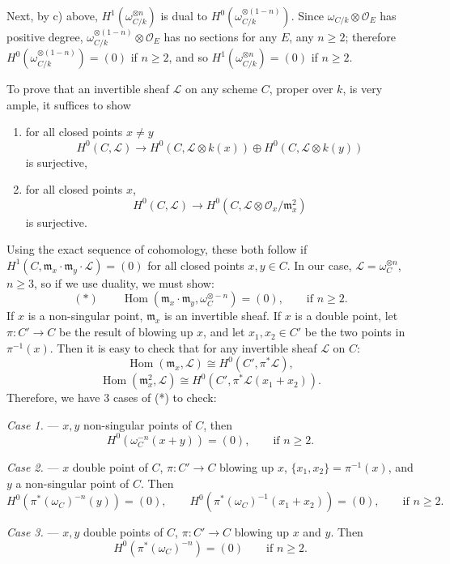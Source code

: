 \documentclass[10pt]{article}
\newcommand{\Hom}{\operatorname{Hom}}
\newcommand{\cO}{\mathcal O}
\newcommand{\cL}{\mathcal L}
\begin{document}
Next, by c) above, $H^1(\omega_{C/k}^{\otimes n})$ is dual to $H^0(\omega_{C/k}^{\otimes(1-n)})$. Since $\omega_{C/k}\otimes\cO_E$ has positive degree, $\omega_{C/k}^{\otimes(1-n)}\otimes\cO_E$ has no sections for any $E$, any $n\geq 2$; therefore $H^0(\omega_{C/k}^{\otimes(1-n)})=(0)$ if $n\geq 2$, and so $H^1(\omega_{C/k}^{\otimes n})=(0)$ if $n\geq 2$.

To prove that an invertible sheaf $\cL$ on any scheme $C$, proper over $k$, is very ample, it suffices to show
\begin{enumerate}[label=\alph*)]
\item for all closed points $x\ne y$
\[
H^0(C,\cL)\to H^0(C,\cL\otimes k(x))\oplus H^0(C,\cL\otimes k(y))
\]
is surjective,
\item for all closed points $x$,
\[
H^0(C,\cL)\to H^0(C,\cL\otimes \cO_x/\mathfrak m_x^2)
\]
is surjective.
\end{enumerate}
Using the exact sequence of cohomology, these both follow if $H^1(C,\mathfrak m_x\cdot \mathfrak m_y\cdot\cL)=(0)$ for all closed points $x,y\in C$. In our case, $\cL=\omega_C^{\otimes n}$, $n\geq 3$, so if we use duality, we must show:
\[
(*)\qquad \Hom(\mathfrak m_x\cdot \mathfrak m_y,\omega_C^{\otimes -n})=(0),\qquad \text{if } n\geq 2.
\]
If $x$ is a non-singular point, $\mathfrak m_x$ is an invertible sheaf. If $x$ is a double point, let $\pi:C'\to C$ be the result of blowing up $x$, and let $x_1,x_2\in C'$ be the two points in $\pi^{-1}(x)$. Then it is easy to check that for any invertible sheaf $\cL$ on $C$:
\[
\Hom(\mathfrak m_x,\cL)\cong H^0(C',\pi^*\cL),
\]
\[
\Hom(\mathfrak m_x^2,\cL)\cong H^0(C',\pi^*\cL(x_1+x_2)).
\]
Therefore, we have 3 cases of (*) to check:

\medskip
\noindent\textit{Case 1.} --- $x,y$ non-singular points of $C$, then
\[
H^0(\omega_C^{-n}(x+y))=(0),\qquad \text{if } n\geq 2.
\]

\medskip
\noindent\textit{Case 2.} --- $x$ double point of $C$, $\pi:C'\to C$ blowing up $x$, $\{x_1,x_2\}=\pi^{-1}(x)$, and $y$ a non-singular point of $C$. Then
\[
H^0(\pi^*(\omega_C)^{-n}(y))=(0),\qquad H^0(\pi^*(\omega_C)^{-1}(x_1+x_2))=(0),\qquad \text{if } n\geq 2.
\]

\medskip
\noindent\textit{Case 3.} --- $x,y$ double points of $C$, $\pi:C'\to C$ blowing up $x$ and $y$. Then
\[
H^0(\pi^*(\omega_C)^{-n})=(0)\qquad \text{if } n\geq 2.
\]
\end{document}

